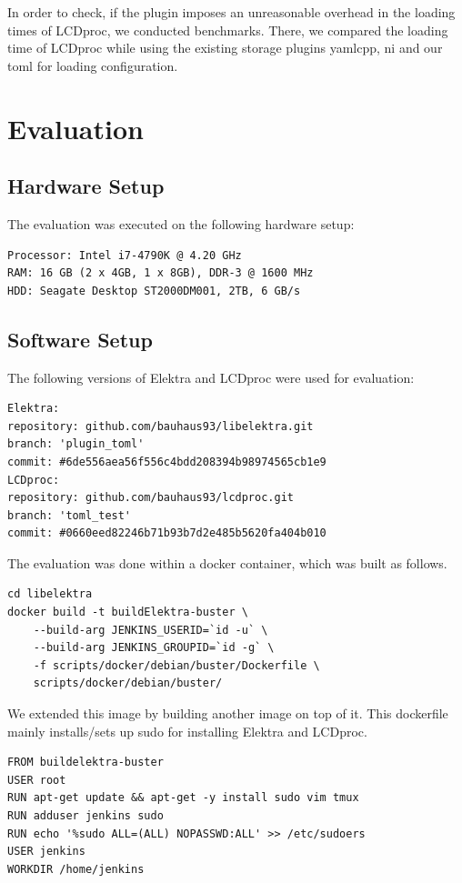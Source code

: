 \documentclass[draft,final]{vutinfth} %
\begin{document}
In order to check, if the plugin imposes an unreasonable overhead in the loading times of LCDproc, we conducted benchmarks.
There, we compared the loading time of LCDproc while using the existing storage plugins yamlcpp, ni and our \acrshort{toml} for loading configuration.


\chapter{Evaluation}

\section{Hardware Setup}
The evaluation was executed on the following hardware setup:
\begin{Verbatim}[frame=single]
Processor: Intel i7-4790K @ 4.20 GHz
RAM: 16 GB (2 x 4GB, 1 x 8GB), DDR-3 @ 1600 MHz 
HDD: Seagate Desktop ST2000DM001, 2TB, 6 GB/s
\end{Verbatim}

\section{Software Setup}

The following versions of Elektra and LCDproc were used for evaluation:
\begin{Verbatim}[frame=single]
Elektra:
repository: github.com/bauhaus93/libelektra.git
branch: 'plugin_toml'
commit: #6de556aea56f556c4bdd208394b98974565cb1e9
LCDproc:
repository: github.com/bauhaus93/lcdproc.git
branch: 'toml_test'
commit: #0660eed82246b71b93b7d2e485b5620fa404b010
\end{Verbatim}


The evaluation was done within a docker container, which was built as follows.
\begin{Verbatim}[frame=single]
cd libelektra
docker build -t buildElektra-buster \
    --build-arg JENKINS_USERID=`id -u` \
    --build-arg JENKINS_GROUPID=`id -g` \
    -f scripts/docker/debian/buster/Dockerfile \
    scripts/docker/debian/buster/
\end{Verbatim}

We extended this image by building another image on top of it. This dockerfile mainly installs/sets up sudo for installing Elektra and LCDproc.
\begin{Verbatim}[frame=single]
FROM buildelektra-buster
USER root
RUN apt-get update && apt-get -y install sudo vim tmux
RUN adduser jenkins sudo
RUN echo '%sudo ALL=(ALL) NOPASSWD:ALL' >> /etc/sudoers
USER jenkins
WORKDIR /home/jenkins
\end{Verbatim}
\end{document}
